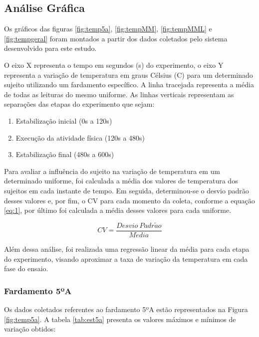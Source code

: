     \subsection{Análise Gráfica}
        Os gráficos das figuras \ref{fig:temp5a}, \ref{fig:tempMM}, \ref{fig:tempMML} e \ref{fig:tempgeral} foram montados
        a partir dos dados coletados pelo sistema desenvolvido para este estudo. 

        O eixo X representa o tempo em segundos (s) do experimento, o eixo Y representa a variação de temperatura em graus Célsius (\degree C) para um 
        determinado sujeito utilizando um fardamento específico. A linha tracejada representa a 
        média de todas as leituras do mesmo uniforme. As linhas verticais representam as separações das etapas
        do experimento que sejam: 
        \begin{enumerate}[label=\Roman*.] %
            \item Estabilização inicial (0s a 120s)
            \item Execução da atividade física (120s a 480s)
            \item Estabilização final (480s a 600s)
            \end{enumerate}
        

        Para avaliar a influência do sujeito na variação de temperatura em um determinado uniforme, foi 
        calculada a média dos valores de temperatura dos sujeitos em cada instante de tempo. Em seguida, 
        determinou-se o desvio padrão desses valores e, por fim, o \acrlong{CV} para cada momento da 
        coleta, conforme a equação \ref{eq:1}, por último foi calculada a média desses valores para cada 
        uniforme.

        \begin{equation} 
            \label{eq:1}CV=\frac{Desvio~Padr\tilde{a}o}{M\acute{e}dia}
            \end{equation}

        Além dessa análise, foi realizada uma regressão linear da média para cada etapa do experimento, 
        visando aproximar a taxa de variação da temperatura em cada fase do ensaio.

        \subsubsection{Fardamento 5ºA}
            Os dados coletados referentes ao fardamento 5ºA estão representados na Figura \ref{fig:temp5a}. 
            A tabela \ref{tab:est5a} presenta os valores máximos e mínimos de variação obtidos:

